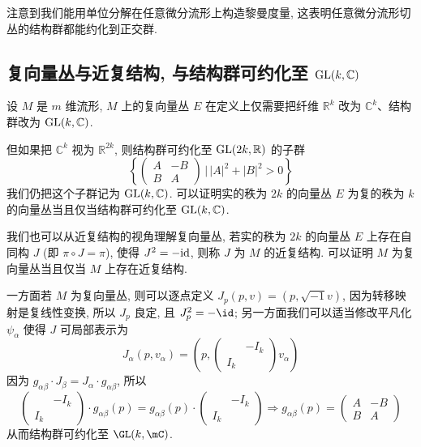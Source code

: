     注意到我们能用单位分解在任意微分流形上构造黎曼度量, 这表明任意微分流形切丛的结构群都能约化到正交群.

    \subsection{复向量丛与近复结构, 与结构群可约化至 ${\rm GL}(k,\mathbb{C})$}
    设 $M$ 是 $m$ 维流形, $M$ 上的复向量丛 $E$ 在定义上仅需要把纤维 $\mathbb{R}^k$ 改为 $\mathbb{C}^k$、结构群改为 ${\rm GL}(k,\mathbb{C})$. 

    但如果把 $\mathbb{C}^k$ 视为 $\mathbb{R}^{2k}$, 则结构群可约化至 ${\rm GL}(2k,\mathbb{R})$ 的子群 
    \begin{equation*}
        \left\{\begin{pmatrix}
            A & -B \\
            B & A
        \end{pmatrix}\,\bigg|\,|A|^2+|B|^2>0\right\}
    \end{equation*}
    我们仍把这个子群记为 ${\rm GL}(k,\mathbb{C})$. 可以证明实的秩为 $2k$ 的向量丛 $E$ 为复的秩为 $k$ 的向量丛当且仅当结构群可约化至 ${\rm GL}(k,\mathbb{C})$.

    我们也可以从近复结构的视角理解复向量丛, 若实的秩为 $2k$ 的向量丛 $E$ 上存在自同构 $J$ (即 $\pi\circ J = \pi$), 使得 $J^2 = -{\rm id}$, 则称 $J$ 为 $M$ 的近复结构. 可以证明 $M$ 为复向量丛当且仅当 $M$ 上存在近复结构.
    
    一方面若 $M$ 为复向量丛, 则可以逐点定义 $J_p(p,v)=(p,\sqrt{-1}v)$, 因为转移映射是复线性变换, 所以 $J_p$ 良定, 且 $J_p^2 = -\id$; 另一方面我们可以适当修改平凡化 $\psi_{\alpha}$ 使得 $J$ 可局部表示为 
    \begin{equation*}
        J_{\alpha}(p,v_{\alpha}) = \left(p,
        \begin{pmatrix}
            & -I_k \\
            I_k & 
        \end{pmatrix}v_{\alpha}\right)
    \end{equation*}
    因为 $g_{\alpha\beta}\cdot J_{\beta} = J_{\alpha}\cdot g_{\alpha\beta}$, 所以
    \begin{equation*}
        \begin{pmatrix}
            & -I_k \\
            I_k & 
        \end{pmatrix}\cdot g_{\alpha\beta}(p) = g_{\alpha\beta}(p)\cdot
        \begin{pmatrix}
            & -I_k \\
            I_k & 
        \end{pmatrix}\Rightarrow g_{\alpha\beta}(p) = 
        \begin{pmatrix}
            A & -B \\
            B & A
        \end{pmatrix}
    \end{equation*}
    从而结构群可约化至 $\GL(k,\mC)$.


